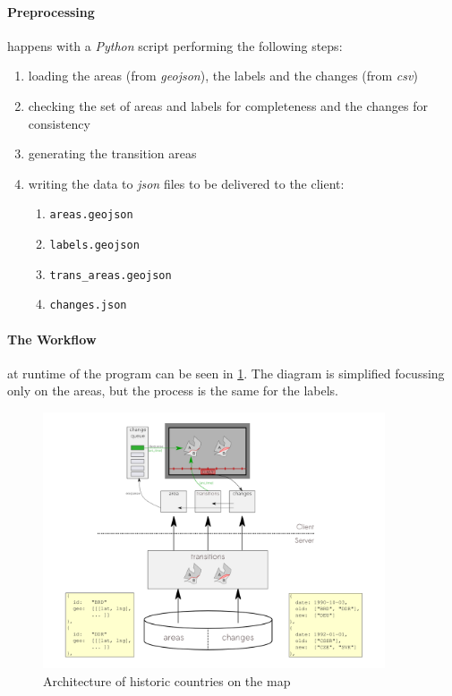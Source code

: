 \vspace{0.5cm}

\paragraph{Preprocessing} happens with a \textit{Python} script performing the following steps:

\begin{enumerate}
  \item loading the areas (from \textit{geojson}), the labels and the changes (from \textit{csv})
  \item checking the set of areas and labels for completeness and the changes for consistency
  \item generating the transition areas
  \item writing the data to \textit{json} files to be delivered to the client:
  \begin{enumerate}
    \item \texttt{areas.geojson}
    \item \texttt{labels.geojson}
    \item \texttt{trans\_areas.geojson}
    \item \texttt{changes.json}
  \end{enumerate}
\end{enumerate}

\paragraph{The Workflow}
at runtime of the program can be seen in \ref{fig:historic_changes}. The diagram is simplified focussing only on the areas, but the process is the same for the labels.


\begin{figure}[H]
  \begin{center}
    \includegraphics[width=0.9\textwidth]{graphics/historic_countries.png}
  \end{center}
  \caption{Architecture of historic countries on the map}
  \label{fig:historic_changes}
\end{figure}

